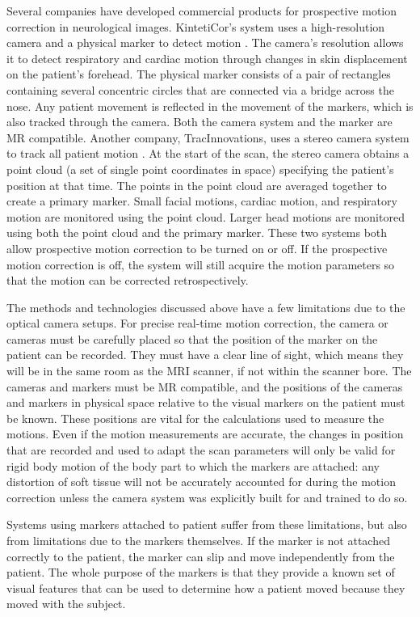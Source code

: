 Several companies have developed commercial products for prospective motion correction in neurological images. KintetiCor's system uses a high-resolution camera and a physical marker to detect motion \cite{kineticor}. The camera's resolution allows it to detect respiratory and cardiac motion through changes in skin displacement on the patient's forehead. The physical marker consists of a pair of rectangles containing several concentric circles that are connected via a bridge across the nose. Any patient movement is reflected in the movement of the markers, which is also tracked through the camera. Both the camera system and the marker are MR compatible. Another company, TracInnovations, uses a stereo camera system to track all patient motion \cite{tracinnovations}. At the start of the scan, the stereo camera obtains a point cloud (a set of single point coordinates in space) specifying the patient's position at that time. The points in the point cloud are averaged together to create a primary marker. Small facial motions, cardiac motion, and respiratory motion are monitored using the point cloud. Larger head motions are monitored using both the point cloud and the primary marker. These two systems both allow prospective motion correction to be turned on or off. If the prospective motion correction is off, the system will still acquire the motion parameters so that the motion can be corrected retrospectively.

The methods and technologies discussed above have a few limitations due to the optical camera setups. For precise real-time motion correction, the camera or cameras must be carefully placed so that the position of the marker on the patient can be recorded. They must have a clear line of sight, which means they will be in the same room as the MRI scanner, if not within the scanner bore. The cameras and markers must be MR compatible, and the positions of the cameras and markers in physical space relative to the visual markers on the patient must be known. These positions are vital for the calculations used to measure the motions. Even if the motion measurements are accurate, the changes in position that are recorded and used to adapt the scan parameters will only be valid for rigid body motion of the body part to which the markers are attached: any distortion of soft tissue will not be accurately accounted for during the motion correction unless the camera system was explicitly built for and trained to do so. 

Systems using markers attached to patient suffer from these limitations, but also from limitations due to the markers themselves. If the marker is not attached correctly to the patient, the marker can slip and move independently from the patient. The whole purpose of the markers is that they provide a known set of visual features that can be used to determine how a patient moved because they moved with the subject.

